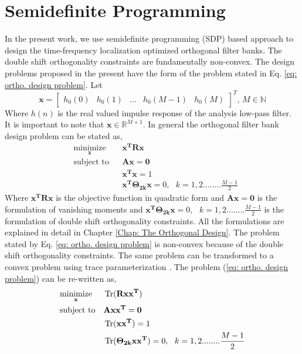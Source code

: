 \section{\label{sec: sdpa}Semidefinite Programming}
In the present work, we use semidefinite programming (SDP) \cite{sdp} based approach to design the time-frequency localization optimized orthogonal filter banks. The double shift orthogonality constraints are fundamentally non-convex.
The design problems proposed in the present have the form of the problem stated in Eq. \ref{eq: ortho. design problem}. Let 
\begin{equation*}
\mathbf{x}=\left[\begin{array}{ccccc}
h_0(0) & h_0(1) & \ldots & h_0(M-1) & h_0(M)\end{array}\right]^{T},\, M\in\mathbb{N}
\end{equation*}
Where $h(n)$ is the real valued impulse response of the analysis low-pass filter. It is important to note that $\mathbf{x} \in \mathbb{R}^{M+1}$. In general the orthogonal filter bank design problem can be stated as,
\begin{equation}
\label{eq: ortho. design problem}
	\begin{aligned}
	& \underset{\mathbf{x}}{\text{minimize}}
	& & \mathbf{x^T}\mathbf{Rx} \\
	& \text{subject to}
	& & \mathbf{A{x}}=\mathbf{0} \\
	&&& \mathbf{{x}^{T}}\mathbf{{x}}=1\\
	&&& \mathbf{{x}^{T}}\mathbf{\Theta_{2k}}\mathbf{{x}}=0,\,\,\,\, k=1,2........\frac{M-1}{2}
	\end{aligned}
	\end{equation}
	Where $\mathbf{x^T}\mathbf{Rx}$ is the objective function in quadratic form and $\mathbf{A{x}}=\mathbf{0}$ is the formulation of vanishing moments and $\mathbf{{x}^{T}}\mathbf{\Theta_{2k}}\mathbf{{x}}=0,\,\,\,\,k=1,2........\frac{M-1}{2}$ is the formulation of double shift orthogonality constraints. All the formulations are explained in detail in Chapter \ref{Chap: The Orthogonal Design}. The problem stated by Eq. \ref{eq: ortho. design problem} is non-convex because of the double shift orthogonality constraints. The same problem can be transformed to a convex problem using trace parameterization \cite{PolynomialBook}. The problem (\ref{eq: ortho. design problem}) can be re-written as,
	\begin{equation}
	\label{eq: ortho. design problem in trace form 1}
		\begin{aligned}
		& \underset{\mathbf{x}}{\text{minimize}}
		& & \operatorname{Tr}(\mathbf{Rx}\mathbf{x^T}) \\
		& \text{subject to}
		& & \mathbf{A{x}{x}^T}=\mathbf{0} \\
		&&& \operatorname{Tr}(\mathbf{{x}}\mathbf{x^{T}})=1\\
		&&& \operatorname{Tr}(\mathbf{\Theta_{2k}}\mathbf{{x}}\mathbf{{x}^{T}})=0,\,\,\,\, k=1,2........\frac{M-1}{2}
		\end{aligned}
		\end{equation}
